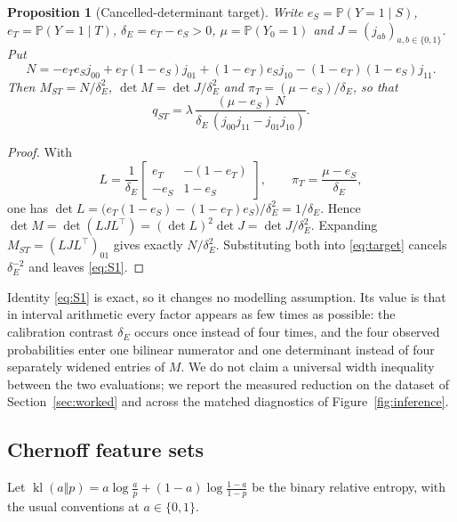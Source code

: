 \documentclass[11pt]{article}
\newtheorem{proposition}[theorem]{Proposition}
\theoremstyle{definition}
\newcommand{\Prob}{\mathbb P}
\newcommand{\kl}{\operatorname{kl}}
\begin{document}
\begin{proposition}[Cancelled-determinant target]\label{prop:cancel}
Write $e_S=\Prob(Y=1\mid S)$, $e_T=\Prob(Y=1\mid T)$, $\delta_E=e_T-e_S>0$,
$\mu=\Prob(Y_0=1)$ and $J=(j_{ab})_{a,b\in\{0,1\}}$. Put
\begin{equation}\label{eq:N}
 N=-e_Te_Sj_{00}+e_T(1-e_S)j_{01}+(1-e_T)e_Sj_{10}-(1-e_T)(1-e_S)j_{11}.
\end{equation}
Then $M_{ST}=N/\delta_E^2$, $\det M=\det J/\delta_E^{2}$ and
$\pi_T=(\mu-e_S)/\delta_E$, so that
\begin{equation}\label{eq:S1}
 \boxed{\;q_{ST}
  =\lambda\,\frac{(\mu-e_S)\,N}{\delta_E\,(j_{00}j_{11}-j_{01}j_{10})}.\;}
\end{equation}
\end{proposition}
\begin{proof}
With
\begin{equation}\label{eq:L}
 L=\frac1{\delta_E}\begin{bmatrix}e_T&-(1-e_T)\\-e_S&1-e_S\end{bmatrix},
 \qquad \pi_T=\frac{\mu-e_S}{\delta_E},
\end{equation}
one has $\det L=\bigl(e_T(1-e_S)-(1-e_T)e_S\bigr)/\delta_E^2=1/\delta_E$. Hence
$\det M=\det(LJL^\top)=(\det L)^2\det J=\det J/\delta_E^2$. Expanding
$M_{ST}=(LJL^\top)_{01}$ gives exactly $N/\delta_E^2$. Substituting both into
\eqref{eq:target} cancels $\delta_E^{-2}$ and leaves \eqref{eq:S1}.
\end{proof}

Identity \eqref{eq:S1} is exact, so it changes no modelling assumption. Its
value is that in interval arithmetic every factor appears as few times as
possible: the calibration contrast $\delta_E$ occurs once instead of four times,
and the four observed probabilities enter one bilinear numerator and one
determinant instead of four separately widened entries of $M$. We do not claim a
universal width inequality between the two evaluations; we report the measured
reduction on the dataset of Section~\ref{sec:worked} and across the matched
diagnostics of Figure~\ref{fig:inference}.

\subsection{Chernoff feature sets}\label{sec:chernoff}
Let $\kl(a\Vert p)=a\log\frac ap+(1-a)\log\frac{1-a}{1-p}$ be the binary
relative entropy, with the usual conventions at $a\in\{0,1\}$.
\end{document}
